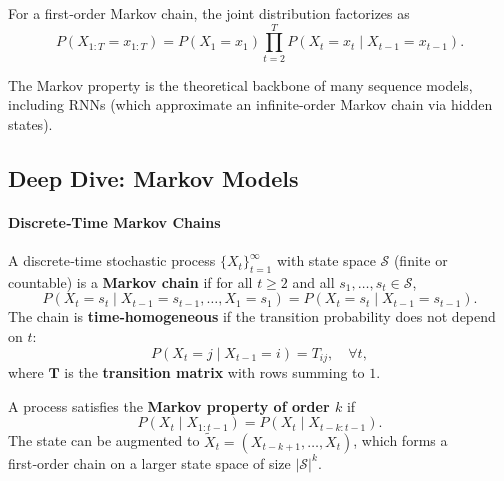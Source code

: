 \documentclass{tufte-handout}
\begin{document}
\begin{thm}
    For a first‑order Markov chain, the joint distribution factorizes as
    \[
    P(X_{1:T} = x_{1:T}) = P(X_1 = x_1) \prod_{t=2}^{T} P(X_t = x_t \mid X_{t-1} = x_{t-1}).
    \]
\end{thm}

The Markov property is the theoretical backbone of many sequence models, including RNNs (which approximate an infinite‑order Markov chain via hidden states).

\subsection{Deep Dive: Markov Models}

\paragraph{Discrete‑Time Markov Chains}
A discrete‑time stochastic process $\{X_t\}_{t=1}^\infty$ with state space $\mathcal{S}$ (finite or countable) is a \textbf{Markov chain} if for all $t \ge 2$ and all $s_1,\dots,s_t \in \mathcal{S}$,
\[
P(X_t = s_t \mid X_{t-1}=s_{t-1}, \dots, X_1=s_1) = P(X_t = s_t \mid X_{t-1}=s_{t-1}).
\]
The chain is \textbf{time‑homogeneous} if the transition probability does not depend on $t$:
\[
P(X_t = j \mid X_{t-1}=i) = T_{ij}, \quad \forall t,
\]
where $\mathbf{T}$ is the \textbf{transition matrix} with rows summing to $1$.

\begin{marginfigure}
\centering
{}
\caption{A three‑state Markov chain with transition probabilities.}
\end{marginfigure}

\begin{defn}
    A process satisfies the \textbf{Markov property of order $k$} if
    \[
    P(X_t \mid X_{1:t-1}) = P(X_t \mid X_{t-k:t-1}).
    \]
    The state can be augmented to $\tilde{X}_t = (X_{t-k+1}, \dots, X_t)$, which forms a first‑order chain on a larger state space of size $|\mathcal{S}|^k$.
\end{defn}
\end{document}
